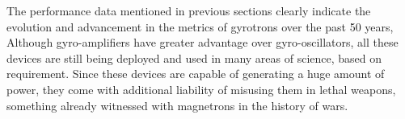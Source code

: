 The performance data mentioned in previous sections clearly indicate the evolution and advancement in the metrics of gyrotrons over the past 50 years, Although gyro-amplifiers have greater advantage over gyro-oscillators, all these devices are still being deployed and used in many areas of science, based on requirement. Since these devices are capable of generating a huge amount of power, they come with additional liability of misusing them in lethal weapons, something already witnessed with magnetrons in the history of wars.